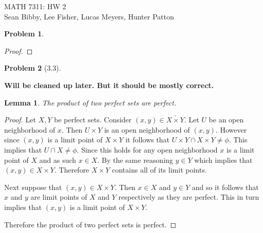 \documentclass[10pt]{article}
\newcommand{\sk}{\vskip 10mm}
\theoremstyle{plain}
\newtheorem{problem}{Problem}
\newtheorem{lemma}{Lemma}[problem]
\theoremstyle{remark}
\begin{document}
\begin{flushright}
  MATH 7311: HW 2\\
  Sean Bibby,
  Lee Fisher,
  Lucas Meyers,
  Hunter Patton
\end{flushright}

\begin{problem}

\end{problem}

\begin{proof}

\end{proof}

\sk

\begin{problem}[3.3]

\end{problem}

\textbf{Will be cleaned up later. But it should be mostly correct.}

\begin{lemma}
  The product of two perfect sets are perfect.
\end{lemma}

\begin{proof}
  Let $X,Y$ be perfect sets. Consider $(x,y)\in \bar{X\times Y}$.
  Let $U$ be an open neighborhood of $x$. Then $U\times Y$ is an
  open neighborhood of $(x,y)$. However since $(x,y)$ is a
  limit point of $X\times Y$ it follows that $U\times Y\cap X\times Y\neq\phi$.
  This implies that $U\cap X\neq\phi$. Since this holds for any
  open neighborhood $x$ is a limit point of $X$ and as
  such $x\in X$. By the same reasoning $y\in Y$ which implies
  that $(x,y)\in X\times Y$. Therefore $X\times Y$ contains all of its
  limit points.

  Next suppose that $(x,y)\in X\times Y$. Then $x\in X$ and $y\in Y$
  and so it follows that $x$ and $y$ are limit points of
  $X$ and $Y$ respectively as they are perfect. This in
  turn implies that $(x,y)$ is a limit point of $X\times Y$.

  Therefore the product of two perfect sets is perfect.
\end{proof}
\end{document}
